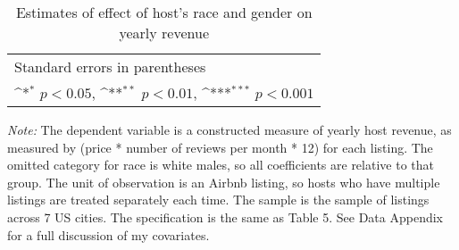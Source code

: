 \documentclass[11pt, oneside]{article}
\begin{document}
\begin{table}[htbp]\centering
	\def\sym#1{\ifmmode^{#1}\else\(^{#1}\)\fi}
	\caption{Estimates of effect of host's race and gender on yearly revenue}
	\begin{tabular}{l*{4}{c}}
		\hline\hline
		
		\hline\hline
		\multicolumn{5}{l}{\footnotesize Standard errors in parentheses}\\
		\multicolumn{5}{l}{\footnotesize \sym{*} \(p<0.05\), \sym{**} \(p<0.01\), \sym{***} \(p<0.001\)}\\
	\end{tabular}

	\begin{tablenotes}

		\item {\it Note:} The dependent variable is a constructed measure of yearly host revenue, as measured by (price * number of reviews per month * 12) for each listing. The omitted category for race is white males, so all coefficients are relative to that group. The unit of observation is an Airbnb listing, so hosts who have multiple listings are treated separately each time. The sample is the sample of listings across 7 US cities. The specification is the same as Table 5. See Data Appendix for a full discussion of my covariates.
	\end{tablenotes}
\end{table}
\end{document}
